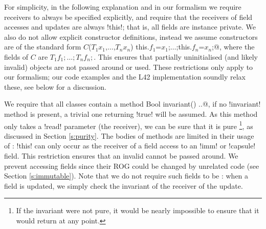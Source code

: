 For simplicity, in the following explanation and in our formalism
we require 
receivers to always be specified explicitly, and require that the receivers of field accesses and updates are always \Q!this!; that is, all fields are instance private.
We also do not allow explicit constructor definitions, instead we assume constructors are of the standard form \Q@$C$($T_1 x_1$,$\ldots$,$T_n x_n$) {this.$f_1$=$x_1$;$\ldots$;this.$f_n$=$x_n$;}@, where the fields of $C$ are $T_1 f_1;\ldots; T_n f_n;$. This ensures that partially uninitialised (and likely invalid) objects are not passed around or used. 
These restrictions only apply to our formalism; our code examples and the L42 implementation soundly relax these, see below for a discussion.%

We require that all classes contain a \Q@read method Bool invariant() {..}@, if no \Q!invariant! method is present, a trivial one returning \Q!true! will be assumed. As this method only takes a \Q!read! parameter (the receiver), we can be sure that it is pure \footnote{If the invariant were not pure, it would be nearly impossible to ensure that it would return \Q@true@ at any point.}, as discussed in Section \ref{s:purity}.
The bodies of \Q@invariant@ methods are limited in their usage of \Q@this@: \Q!this! can only occur  as the receiver of a field access to an \Q!imm! or \Q!capsule! field. This restriction ensures that 
an invalid \Q@this@ cannot be passed around.
We prevent accessing \Q@mut@ fields since their ROG could be changed by unrelated code (see Section \ref{s:immutable}).
Note that we do not require such fields to be \Q@final@: when a field is updated, we simply check the invariant of the receiver of the update.

